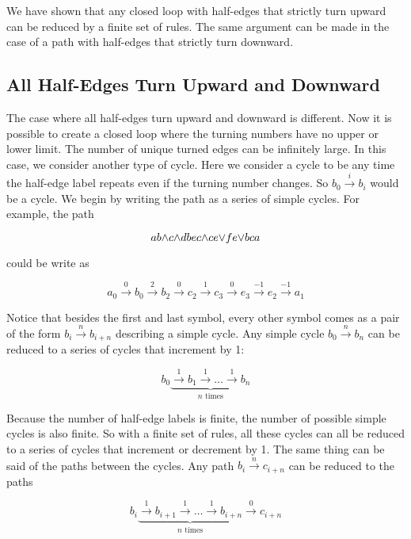 \documentclass[acmtog]{acmart}
\begin{document}
We have shown that any closed loop with half-edges that strictly turn upward 
can be reduced by a finite set of rules. The same argument can be made in the 
case of a path with half-edges that strictly turn downward.

\subsection{All Half-Edges Turn Upward and Downward}

The case where all half-edges turn upward and downward is different. Now it is possible
to create a closed loop where the turning numbers have no upper or lower limit.
The number of unique turned edges can be infinitely large. In this
case, we consider another type of cycle. Here we consider a cycle to be any time
the half-edge label repeats even if the turning number changes. So
$b_0 \xrightarrow{i} b_i$ would be a cycle. We begin by writing the path as a
series of simple cycles. For example, the path

\begin{equation}
ab {\wedge} c {\wedge} dbec {\wedge} ce {\vee} fe {\vee} bca
\end{equation}

could be write as 

\begin{equation}
a_0 \xrightarrow{0} b_0 \xrightarrow{2} b_2  \xrightarrow{0} c_2 \xrightarrow{1} c_3 \xrightarrow{0} e_3 \xrightarrow{-1} e_2 \xrightarrow{-1} a_1
\end{equation}

Notice that besides the first and last symbol, every other symbol comes as a
pair of the form $b_i \xrightarrow{n} b_{i+n}$ describing a simple cycle. Any
simple cycle $b_0 \xrightarrow{n} b_n$ can be reduced to a series of cycles that
increment by 1:

\begin{equation}
b_0 \underbrace{\xrightarrow{1} b_1 \xrightarrow{1} \ldots \xrightarrow{1} b_n}_{\text{$n$ times}}
\end{equation}

Because the number of half-edge labels is finite, the number of possible simple
cycles is also finite. So with a finite set of rules, all these cycles can all
be reduced to a series of cycles that increment or decrement by 1. The same thing can be said of the
paths between the cycles. Any path $b_i \xrightarrow{n} c_{i+n}$ can be reduced
to the paths

\begin{equation}
b_i \underbrace{\xrightarrow{1} b_{i+1} \xrightarrow{1} \ldots \xrightarrow{1} b_{i+n}}_{\text{$n$ times}} \xrightarrow{0} c_{i+n}
\end{equation}
\end{document}
